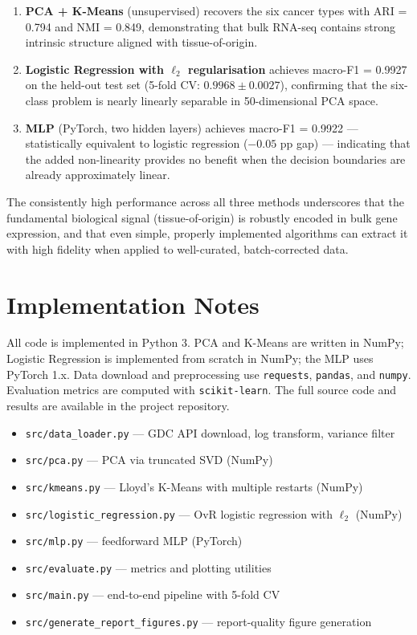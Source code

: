 \documentclass[11pt,letterpaper]{article}
\begin{document}
\begin{enumerate}[leftmargin=2em,itemsep=2pt]
  \item \textbf{PCA + K-Means} (unsupervised) recovers the six cancer types
        with ARI = 0.794 and NMI = 0.849, demonstrating that bulk RNA-seq
        contains strong intrinsic structure aligned with tissue-of-origin.

  \item \textbf{Logistic Regression with $\ell_2$ regularisation} achieves
        macro-F1 = 0.9927 on the held-out test set (5-fold CV: $0.9968 \pm
        0.0027$), confirming that the six-class problem is nearly linearly
        separable in 50-dimensional PCA space.

  \item \textbf{MLP} (PyTorch, two hidden layers) achieves macro-F1 = 0.9922
        --- statistically equivalent to logistic regression ($-0.05$ pp gap)
        --- indicating that the added non-linearity provides no benefit when
        the decision boundaries are already approximately linear.
\end{enumerate}

The consistently high performance across all three methods underscores that the
fundamental biological signal (tissue-of-origin) is robustly encoded in bulk
gene expression, and that even simple, properly implemented algorithms can
extract it with high fidelity when applied to well-curated, batch-corrected
data.

\section*{Implementation Notes}

All code is implemented in Python 3.  PCA and K-Means are written in NumPy;
Logistic Regression is implemented from scratch in NumPy; the MLP uses PyTorch
1.x.  Data download and preprocessing use \texttt{requests}, \texttt{pandas},
and \texttt{numpy}.  Evaluation metrics are computed with \texttt{scikit-learn}.
The full source code and results are available in the project repository.

\begin{itemize}[leftmargin=2em,itemsep=1pt]
  \item \texttt{src/data\_loader.py} --- GDC API download, log transform, variance filter
  \item \texttt{src/pca.py} --- PCA via truncated SVD (NumPy)
  \item \texttt{src/kmeans.py} --- Lloyd's K-Means with multiple restarts (NumPy)
  \item \texttt{src/logistic\_regression.py} --- OvR logistic regression with $\ell_2$ (NumPy)
  \item \texttt{src/mlp.py} --- feedforward MLP (PyTorch)
  \item \texttt{src/evaluate.py} --- metrics and plotting utilities
  \item \texttt{src/main.py} --- end-to-end pipeline with 5-fold CV
  \item \texttt{src/generate\_report\_figures.py} --- report-quality figure generation
\end{itemize}
\end{document}
